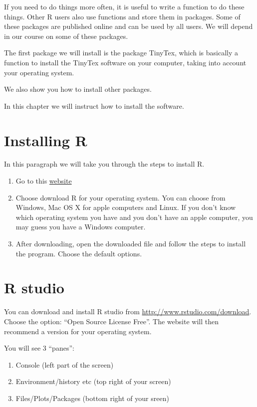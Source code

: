 \documentclass[
]{book}
\providecommand{\tightlist}{%
  \setlength{\itemsep}{0pt}\setlength{\parskip}{0pt}}
\begin{document}
If you need to do things more often, it is useful to write a function to do these things. Other R users also use functions and store them in packages. Some of these packages are published online and can be used by all users. We will depend in our course on some of these packages.

The first package we will install is the package TinyTex, which is basically a function to install the TinyTex software on your computer, taking into account your operating system.

We also show you how to install other packages.

In this chapter we will instruct how to install the software.

\hypertarget{installing-r}{%
\section{Installing R}\label{installing-r}}

In this paragraph we will take you through the steps to install R.

\begin{enumerate}
\def\labelenumi{\arabic{enumi}.}
\tightlist
\item
  Go to this \href{https://mirror.lyrahosting.com/CRAN/}{website}
\item
  Choose download R for your operating system. You can choose from Windows, Mac OS X for apple computers and Linux. If you don't know which operating system you have and you don't have an apple computer, you may guess you have a Windows computer.
\item
  After downloading, open the downloaded file and follow the steps to install the program. Choose the default options.
\end{enumerate}

\hypertarget{r-studio}{%
\section{R studio}\label{r-studio}}

You can download and install R studio from \url{http://www.rstudio.com/download}. Choose the option: ``Open Source License Free''. The website will then recommend a version for your operating system.

You will see 3 ``panes'':

\begin{enumerate}
\def\labelenumi{\arabic{enumi}.}
\tightlist
\item
  Console (left part of the screen)
\item
  Environment/history etc (top right of your screen)
\item
  Files/Plots/Packages (bottom right of your sreen)
\end{enumerate}
\end{document}
